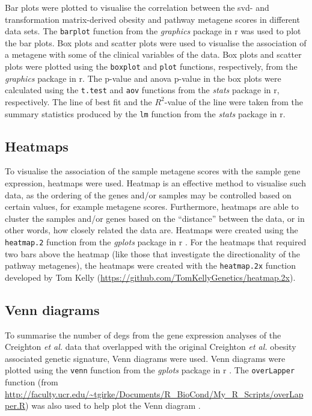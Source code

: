 Bar plots were plotted to visualise the correlation between the \gls{svd}- and transformation matrix-derived obesity and pathway metagene scores in different data sets.
The \texttt{barplot} function from the \textit{graphics} package in \gls{r} was used to plot the bar plots.
Box plots and scatter plots were used to visualise the association of a metagene with some of the clinical variables of the data.
Box plots and scatter plots were plotted using the \texttt{boxplot} and \texttt{plot} functions, respectively, from the \textit{graphics} package in \gls{r}.
The p-value and \gls{anova} p-value in the box plots were calculated using the \texttt{t.test} and \texttt{aov} functions from the \textit{stats} package in \gls{r}, respectively.
The line of best fit and the $R^2$-value of the line were taken from the summary statistics produced by the \texttt{lm} function from the \textit{stats} package in \gls{r}.

\subsection{Heatmaps}
\label{sub:heatmaps}

To visualise the association of the sample metagene scores with the sample gene expression, heatmaps were used.
Heatmap is an effective method to visualise such data, as the ordering of the genes and/or samples may be controlled based on certain values, for example metagene scores.
Furthermore, heatmaps are able to cluster the samples and/or genes based on the ``distance'' between the data, or in other words, how closely related the data are.
Heatmaps were created using the \texttt{heatmap.2} function from the \textit{gplots} package in \gls{r} \citep{gplots}.
For the heatmaps that required two bars above the heatmap (like those that investigate the directionality of the pathway metagenes), the heatmaps were created with the \texttt{heatmap.2x} function developed by Tom Kelly (\url{https://github.com/TomKellyGenetics/heatmap.2x}).

\vspace{-2mm}

\subsection{Venn diagrams}
\label{sub:venn_diagrams}

To summarise the number of \glspl{deg} from the gene expression analyses of the Creighton \textit{et al.} data that overlapped with the original Creighton \textit{et al.} obesity associated genetic signature, Venn diagrams were used.
Venn diagrams were plotted using the \texttt{venn} function from the \textit{gplots} package in \gls{r} \citep{gplots}.
The \texttt{overLapper} function (from \url{http://faculty.ucr.edu/~tgirke/Documents/R_BioCond/My_R_Scripts/overLapper.R}) was also used to help plot the Venn diagram \citep{Girke2016}.

